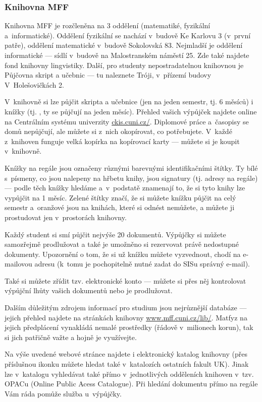 \subsubsection{Knihovna MFF}
Knihovna MFF je rozčleněna na 3 oddělení (matematiké, fyzikální
a~informatické). Oddělení fyzikální se nachází v~budově Ke Karlovu 3
(v~první patře), oddělení matematické v~budově Sokolovská 83.
Nejmladší je oddělení informatické --- sídlí v~budově na
Malostranském náměstí 25. Zde také najdete fond knihovny
lingvistiky. Další, pro studenty nepostradatelnou knihovnou je
Půjčovna skript a učebnic --- tu naleznete Tróji, v~přízemí budovy
V~Holešovičkách 2.

V~knihovně si lze půjčit skripta a učebnice (jen na jeden semestr,
tj. 6 měsíců) i knížky (tj. , ty se půjčují na
jeden měsíc). Přehled vašich výpůjček najdete online na Centrálním
systému univerzity \url{ckis.cuni.cz/}. Diplomové práce
a~časopisy se domů nepůjčují, ale můžete si z~nich okopírovat, co
potřebujete. V~každé z~knihoven funguje velká kopírka na
kopírovací karty --- můžete si je koupit v~knihovně.

Knížky na regále jsou označeny různými barevnými identifikačními
štítky. Ty bílé s~písmeny, co jsou nalepeny na hřbetu knihy, jsou
signatury (tj. adresy na regále) --- podle těch knížky hledáme
a~v~podstatě znamenají to, že si tyto knihy lze vypůjčit na 1 měsíc.
Zelené štítky značí, že si můžete knížku půjčit na celý semestr
a~oranžové jsou na knihách, které si odnést nemůžete, a můžete ji
prostudovat jen v~prostorách knihovny.

Každý student si smí půjčit nejvýše 20 dokumentů. Výpůjčky si
můžete samozřejmě prodlužovat a také je umožněno si rezervovat
právě nedostupné dokumenty. Upozornění o tom, že si už knížku
můžete vyzvednout, chodí na e-mailovou adresu (k~tomu je
pochopitelně nutné zadat do SISu správný e-mail).

Také si můžete zřídit tzv. elektronické konto --- můžete si přes
něj kontrolovat výpůjční lhůty vašich dokumentů nebo je
prodlužovat.

Dalším důležitým zdrojem informací pro studium jsou nejrůznější
databáze --- jejich přehled najdete na stránkách knihovny \url{www.mff.cuni.cz/lib/}. Matfyz na jejich předplácení
vynakládá nemalé prostředky (řádově v~milionech korun), tak si
jich patřičně važte a hojně je využívejte.

Na výše uvedené webové stránce najdete i elektronický katalog
knihovny (přes příslušnou ikonku můžete hledat také v~katalozích
ostatních fakult UK). Jinak lze v~katalogu vyhledávat také přímo
v~jednotlivých odděleních knihoven v~tzv. OPACu (Online Public Acess
Catalogue). Při hledání dokumentu přímo na regále Vám ráda pomůže
služba u~výpůjčky.

